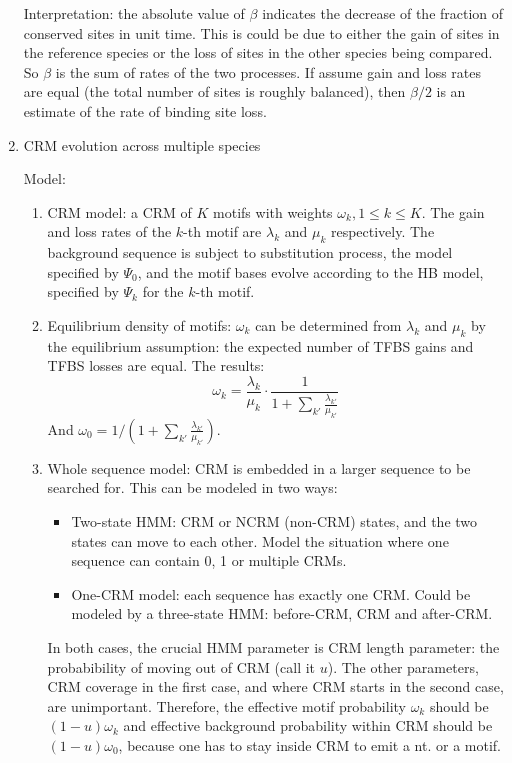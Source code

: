 \documentclass[11pt]{article}
\begin{document}
\begin{enumerate}
Interpretation: the absolute value of $\beta$ indicates the decrease of the fraction of conserved sites in unit time. This is could be due to either the gain of sites in the reference species or the loss of sites in the other species being compared. So $\beta$ is the sum of rates of the two processes. If assume gain and loss rates are equal (the total number of sites is roughly balanced), then $\beta/2$ is an estimate of the rate of binding site loss. 

\newpage

\item{CRM evolution across multiple species}

Model: 

\begin{enumerate}

\item CRM model: a CRM of $K$ motifs with weights $\omega_k, 1 \leq k \leq K$. The gain and loss rates of the $k$-th motif are $\lambda_k$ and $\mu_k$ respectively. The background sequence is subject to substitution process, the model specified by $\Psi_0$, and the motif bases evolve according to the HB model, specified by $\Psi_k$ for the $k$-th motif. 

\item Equilibrium density of motifs: $\omega_k$ can be determined from $\lambda_k$ and $\mu_k$ by the equilibrium assumption: the expected number of TFBS gains and TFBS losses are equal. The results: 
\begin{equation}
\omega_k = \frac{\lambda_k}{\mu_k} \cdot \frac{1}{1 + \sum_{k'}\frac{\lambda_{k'}}{\mu_{k'}}} 
\end{equation}
And $\omega_0 = 1/(1 + \sum_{k'}\frac{\lambda_{k'}}{\mu_{k'}})$. 

\item Whole sequence model: CRM is embedded in a larger sequence to be searched for. This can be modeled in two ways: 
\begin{itemize}
\item Two-state HMM: CRM or NCRM (non-CRM) states, and the two states can move to each other. Model the situation where one sequence can contain 0, 1 or multiple CRMs. 
\item One-CRM model: each sequence has exactly one CRM. Could be modeled by a three-state HMM: before-CRM, CRM and after-CRM. 
\end{itemize}
In both cases, the crucial HMM parameter is CRM length parameter: the probabibility of moving out of CRM (call it $u$). The other parameters, CRM coverage in the first case, and where CRM starts in the second case, are unimportant. Therefore, the effective motif probability $\omega_k$ should be $(1 - u) \omega_k$ and effective background probability within CRM should be $(1 - u) \omega_0$, because one has to stay inside CRM to emit a nt. or a motif. 


\end{enumerate}
\end{enumerate}
\end{document}
